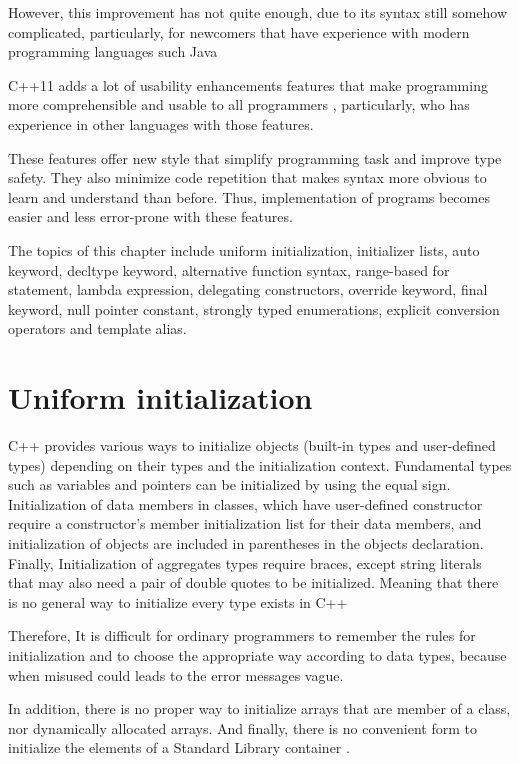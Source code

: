 \documentclass[11pt]{report}
\begin{document}
However, this improvement has not quite enough, due to its syntax still somehow complicated, particularly, for newcomers that have experience with modern programming languages such Java

C++11 adds a lot of usability enhancements features that make programming more comprehensible and usable to all programmers , particularly, who has experience in other languages with those features.

These features offer new style that simplify programming task and improve type safety.  They also minimize code repetition that makes syntax more obvious to learn and understand than before. Thus, implementation of programs becomes easier and less error-prone with these features.

The topics of this chapter include uniform initialization, initializer lists, auto keyword, decltype keyword, alternative function syntax, range-based for statement, lambda expression, delegating constructors, override keyword, final keyword, null pointer constant, strongly typed enumerations, explicit conversion operators and template alias.

\section{Uniform initialization}
\label{section:Uniform initialization}
C++ provides various ways to initialize objects (built-in types and user-defined types) depending on their types and the initialization context. Fundamental types such as variables and pointers can be initialized by using the equal sign. Initialization of data members in classes, which have user-defined constructor require a constructor's member initialization list for their data members, and initialization of objects are included in parentheses in the objects declaration. Finally, Initialization of aggregates types require braces, except string literals that may also need a pair of double quotes to be initialized. Meaning that there is no general way to initialize every type exists in C++ \cite{Stroustrup:2012:Cpp11}


Therefore, It is difficult for ordinary programmers to remember the rules for initialization and to choose the appropriate way according to data types, because when misused could leads to the error messages vague.


In addition, there is no proper way to initialize arrays that are member of a class, nor dynamically allocated arrays. And finally, there is no convenient form to initialize the elements of a Standard Library container \cite{Stroustrup:2012:Cpp11}.
\end{document}

